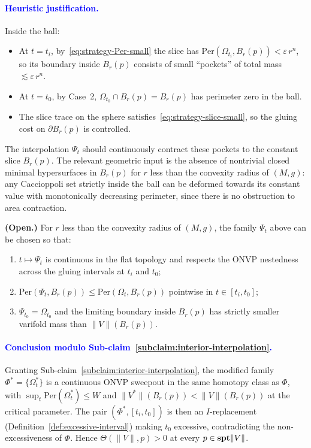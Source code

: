 \paragraph{\textcolor{blue}{Heuristic justification.}}
Inside the ball:
\begin{itemize}[leftmargin=1.5em]
    \item At $t = t_i$, by~\eqref{eq:strategy-Per-small} the slice has $\mathrm{Per}(\Omega_{t_i}, B_r(p)) < \varepsilon\, r^n$, so its boundary inside $B_r(p)$ consists of small ``pockets'' of total mass $\lesssim \varepsilon\, r^n$.
    \item At $t = t_0$, by Case~2, $\Omega_{t_0} \cap B_r(p) = B_r(p)$ has perimeter zero in the ball.
    \item The slice trace on the sphere satisfies~\eqref{eq:strategy-slice-small}, so the gluing cost on $\partial B_r(p)$ is controlled.
\end{itemize}
The interpolation $\Psi_t$ should continuously contract these pockets to the constant slice $B_r(p)$. The relevant geometric input is the absence of nontrivial closed minimal hypersurfaces in $B_r(p)$ for $r$ less than the convexity radius of $(M,g)$: any Caccioppoli set strictly inside the ball can be deformed towards its constant value with monotonically decreasing perimeter, since there is no obstruction to area contraction.

\begin{subclaim}\label{subclaim:interior-interpolation}
\textbf{(Open.)} For $r$ less than the convexity radius of $(M,g)$, the family $\Psi_t$ above can be chosen so that:
\begin{enumerate}[label=\textup{(\roman*)}, leftmargin=2em]
    \item $t \mapsto \Psi_t$ is continuous in the flat topology and respects the ONVP nestedness across the gluing intervals at $t_i$ and $t_0$;
    \item $\mathrm{Per}(\Psi_t, B_r(p)) \le \mathrm{Per}(\Omega_t, B_r(p))$ pointwise in $t \in [t_i, t_0]$;
    \item $\Psi_{t_0} = \Omega_{t_0}$ and the limiting boundary inside $B_r(p)$ has strictly smaller varifold mass than $\|V\|(B_r(p))$.
\end{enumerate}
\end{subclaim}

\paragraph{\textcolor{blue}{Conclusion modulo Sub-claim~\ref{subclaim:interior-interpolation}.}}
Granting Sub-claim~\ref{subclaim:interior-interpolation}, the modified family $\Phi^* = \{\Omega^*_t\}$ is a continuous ONVP sweepout in the same homotopy class as $\Phi$, with $\sup_t \mathrm{Per}(\Omega^*_t) \le W$ and $\|V^*\|(B_r(p)) < \|V\|(B_r(p))$ at the critical parameter. The pair $(\Phi^*, [t_i, t_0])$ is then an $I$-replacement (Definition~\ref{def:excessive-interval}) making $t_0$ excessive, contradicting the non-excessiveness of $\Phi$. Hence $\Theta(\|V\|, p) > 0$ at every $p \in \mathbf{spt}\|V\|$.

